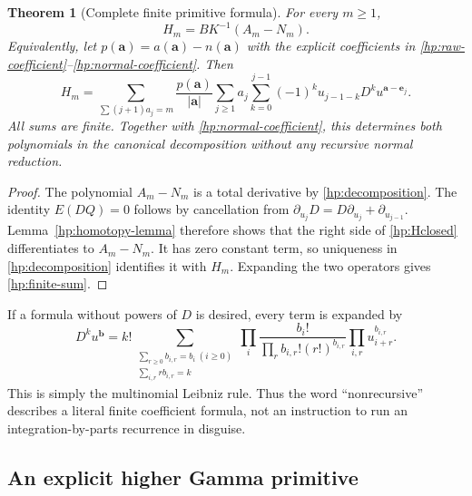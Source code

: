 \documentclass[11pt,a4paper]{article}
\newtheorem{theorem}{Theorem}[section]
\theoremstyle{definition}
\theoremstyle{remark}
\numberwithin{equation}{section}
\begin{document}
\begin{theorem}[Complete finite primitive formula]\label{hp:closed}
For every $m\ge1$,
\begin{equation}\label{hp:Hclosed}
 \boxed{\displaystyle H_m=BK^{-1}(A_m-N_m).}
\end{equation}
Equivalently, let $p(\boldsymbol a)=a(\boldsymbol a)-n(\boldsymbol a)$
with the explicit coefficients in
\eqref{hp:raw-coefficient}--\eqref{hp:normal-coefficient}. Then
\begin{equation}\label{hp:finite-sum}
 \boxed{\displaystyle
 H_m=\sum_{\sum(j+1)a_j=m}\frac{p(\boldsymbol a)}{|\boldsymbol a|}
       \sum_{j\ge1}a_j\sum_{k=0}^{j-1}(-1)^k
                  u_{j-1-k}D^k u^{\boldsymbol a-\boldsymbol e_j}.}
\end{equation}
All sums are finite. Together with \eqref{hp:normal-coefficient},
this determines both polynomials in the canonical decomposition
without any recursive normal reduction.
\end{theorem}

\begin{proof}
The polynomial $A_m-N_m$ is a total derivative by
\eqref{hp:decomposition}. The identity $E(DQ)=0$ follows by cancellation
from
$\partial_{u_j}D=D\partial_{u_j}+\partial_{u_{j-1}}$.
Lemma~\ref{hp:homotopy-lemma} therefore shows that the right side of
\eqref{hp:Hclosed} differentiates to $A_m-N_m$.
It has zero constant term, so uniqueness in
\eqref{hp:decomposition} identifies it with $H_m$.
Expanding the two operators gives \eqref{hp:finite-sum}.
\end{proof}

If a formula without powers of $D$ is desired, every term is expanded by
\begin{equation}\label{hp:Dexpansion}
 D^k u^{\boldsymbol b}
 =k!\sum_{\substack{\sum_{r\ge0}b_{i,r}=b_i\ (i\ge0)\\
                         \sum_{i,r}r b_{i,r}=k}}
       \prod_i\frac{b_i!}{\prod_r b_{i,r}!(r!)^{b_{i,r}}}
       \prod_{i,r}u_{i+r}^{b_{i,r}}.
\end{equation}
This is simply the multinomial Leibniz rule. Thus the word
``nonrecursive'' describes a literal finite coefficient formula,
not an instruction to run an integration-by-parts recurrence in disguise.

\subsection{An explicit higher Gamma primitive}
\end{document}
